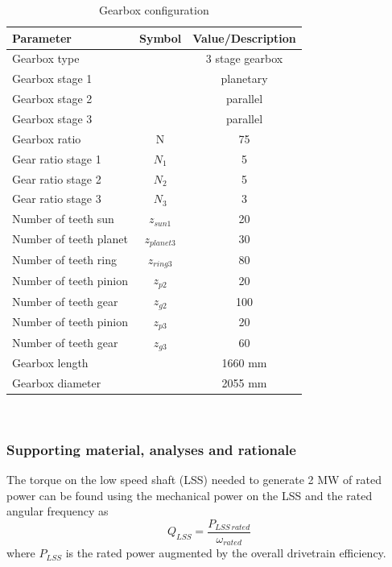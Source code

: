 \begin{table}[h]
\centering
\caption{Gearbox configuration}
\label{tab:gearbox_config}
\begin{tabular}{ |l|c|c| } 
\hline
\textbf{Parameter} & \textbf{Symbol} & \textbf{Value/Description}\\ 
\hline
Gearbox type & & 3 stage gearbox\\
\hline
Gearbox stage 1 & & planetary\\
\hline
Gearbox stage 2 & & parallel\\
\hline
Gearbox stage 3 & & parallel\\
\hline
Gearbox ratio & N & 75 \\
\hline
Gear ratio stage 1 & $N_1$ & 5\\
\hline
Gear ratio stage 2 & $N_2$ & 5\\
\hline
Gear ratio stage 3 & $N_3$ & 3\\
\hline
Number of teeth sun& $z_{sun1}$ & 20\\
\hline
Number of teeth planet& $z_{planet3}$ & 30\\
\hline
Number of teeth ring& $z_{ring3}$ & 80\\
\hline
Number of teeth pinion& $z_{p2}$ & 20\\
\hline
Number of teeth gear& $z_{g2}$ & 100\\
\hline
Number of teeth pinion& $z_{p3}$ & 20\\
\hline
Number of teeth gear& $z_{g3}$ & 60\\
\hline
Gearbox length& & 1660 mm\\
\hline
Gearbox diameter& & 2055 mm\\
\hline
\end{tabular} \\
\end{table}

\subsubsection{Supporting material, analyses and rationale}

The torque on the low speed shaft (LSS) needed to generate 2 MW of rated power can be found using the mechanical power on the LSS and the rated angular frequency as
\begin{equation}
    Q_{LSS} = \dfrac{P_{LSS\, rated}}{\omega_{rated}}
    \label{eq:Q_LSS}
\end{equation}
where $P_{LSS}$ is the rated power augmented by the overall drivetrain efficiency. 

